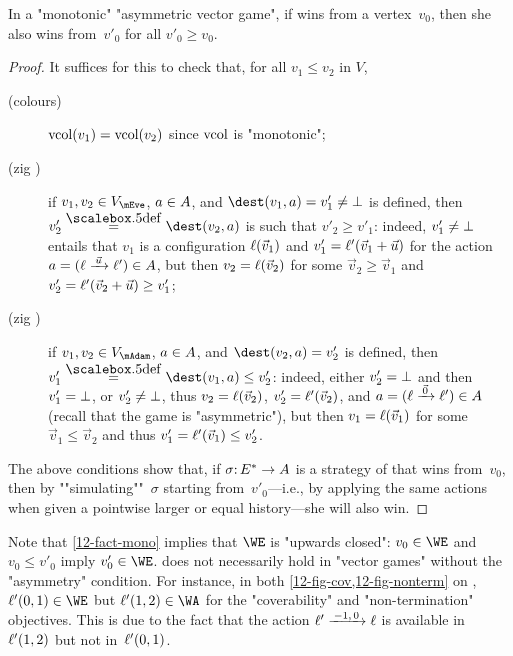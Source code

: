 \begin{lemma}[Simulation]\label{12-fact-mono}
  In a "monotonic" "asymmetric vector game", if \Eve wins from a
  vertex~$v_0$, then she also wins from~$v'_0$ for all $v'_0\geq
  v_0$.
\end{lemma}
\begin{proof}
  It suffices for this to check that, for all $v_1\leq v_2$ in $V$,
  \begin{description}
  \item[(colours)] $\mathrm{vcol}(v_1)=\mathrm{vcol}(v_2)$ since $\mathrm{vcol}$ is "monotonic";
  \item[(zig \Eve)] if $v_1,v_2\in V_\mEve$, $a\in A$, and
    $\dest(v_1,a)=v'_1\neq\sink$ is defined, then
    $v'_2\eqdef\dest(v_2,a)$ is such that $v'_2\geq v'_1$: indeed,
    $v'_1\neq\bot$ entails that $v_1$ is a configuration
    $\ell(\vec v_1)$ and $v'_1=\ell'(\vec v_1+\vec u)$ for the action
    $a=(\loc\step{\vec u}\loc')\in\Act$, but then $v_2=\ell(\vec v_2)$
    for some $\vec v_2\geq\vec v_1$ and
    $v'_2=\ell'(\vec v_2+\vec u)\geq v'_1$;
  \item[(zig \Adam)] if $v_1,v_2\in V_\mAdam$, $a\in A$, and
    $\dest(v_2,a)=v'_2$ is defined, then
    $v'_1\eqdef\dest(v_1,a)\leq v'_2$: indeed, either $v'_2=\bot$ and
    then $v'_1=\bot$, or $v'_2\neq\bot$, thus
    $v_2=\ell(\vec v_2)$, $v'_2=\ell'(\vec v_2)$, and
    $a=(\loc\step{\vec 0}\loc')\in\Act$ (recall that the game is
    "asymmetric"), but then $v_1=\ell(\vec v_1)$ for some
    $\vec v_1\leq\vec v_2$ and thus $v'_1=\ell'(\vec v_1)\leq v'_2$.
  \end{description}
  The above conditions show that, if $\sigma{:}\,E^\ast\to A$ is a
  strategy of \Eve that wins from~$v_0$, then by
  ""simulating""~$\sigma$ starting from~$v'_0$---i.e., by applying the
  same actions when given a pointwise larger or equal history---she
  will also win.
\end{proof}

Note that \cref{12-fact-mono} implies that $\WE$ is "upwards closed":
$v_0\in\WE$ and $v_0\leq v'_0$ imply $v_0'\in\WE$.  
does not necessarily hold in "vector games" without the "asymmetry"
condition.  For instance, in both \cref{12-fig-cov,12-fig-nonterm} on
, $\loc'(0,1)\in\WE$ but $\loc'(1,2)\in\WA$ for
the "coverability" and "non-termination" objectives.  This is due to
the fact that the action $\loc'\step{-1,0}\loc$ is available
in~$\ell'(1,2)$ but not in~$\ell'(0,1)$.


